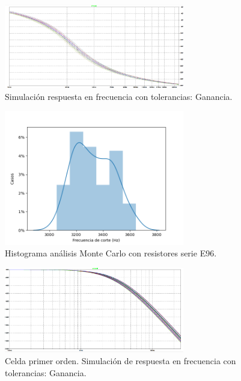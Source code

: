 \begin{figure}[H]
    \centering
    \includegraphics[width= 0.7\textwidth]{../Ejercicio2-DisenoDeCeldas/1CeldaSallenKey/images/simuFaseNormalizados.png}
    \caption{Simulación respuesta en frecuencia con tolerancias: Ganancia.}
    \label{fig:simuphase}
\end{figure}

\begin{figure}[H]
    \centering
    \includegraphics[width= 0.7\textwidth]{../Ejercicio2-DisenoDeCeldas/1CeldaSallenKey/images/MCSinPreset.png}
    \caption{Histograma análisis Monte Carlo con resistores serie E96.}
    \label{fig:MCE96}
\end{figure}

\begin{figure}[H]
    \centering
    \includegraphics[width= 0.7\textwidth]{../Ejercicio2-DisenoDeCeldas/1CeldaSallenKey/images/MAG1stOrder.png}
    \caption{Celda primer orden. Simulación de respuesta en frecuencia con tolerancias: Ganancia.}
    \label{fig:1LPsimugain}
\end{figure}

